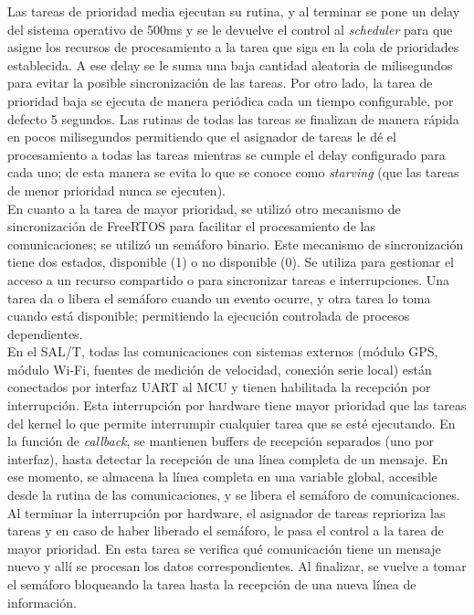 Las tareas de prioridad media ejecutan su rutina, y al terminar se pone un delay del sistema operativo de 500ms y se le devuelve el control al \textit{scheduler} para que asigne los recursos de procesamiento a la tarea que siga en la cola de prioridades establecida. A ese delay se le suma una baja cantidad aleatoria de milisegundos para evitar la posible sincronización de las tareas. Por otro lado, la tarea de prioridad baja se ejecuta de manera periódica cada un tiempo configurable, por defecto 5 segundos. Las rutinas de todas las tareas se finalizan de manera rápida en pocos milisegundos permitiendo que el asignador de tareas le dé el procesamiento a todas las tareas mientras se cumple el delay configurado para cada uno; de esta manera se evita lo que se conoce como \textit{starving} (que las tareas de menor prioridad nunca se ejecuten). \\ 

En cuanto a la tarea de mayor prioridad, se utilizó otro mecanismo de sincronización de FreeRTOS para facilitar el procesamiento de las comunicaciones; se utilizó un semáforo binario. Este mecanismo de sincronización tiene dos estados, disponible (1) o no disponible (0). Se utiliza para gestionar el acceso a un recurso compartido o para sincronizar tareas e interrupciones. Una tarea da o libera el semáforo cuando un evento ocurre, y otra tarea lo toma cuando está disponible; permitiendo la ejecución controlada de procesos dependientes. \\

En el SAL/T, todas las comunicaciones con sistemas externos (módulo GPS, módulo Wi-Fi, fuentes de medición de velocidad, conexión serie local) están conectados por interfaz UART al MCU y tienen habilitada la recepción por interrupción. Esta interrupción por hardware tiene mayor prioridad que las tareas del kernel lo que permite interrumpir cualquier tarea que se esté ejecutando. En la función de \textit{callback}, se mantienen buffers de recepción separados (uno por interfaz), hasta detectar la recepción de una línea completa de un mensaje. En ese momento, se almacena la línea completa en una variable global, accesible desde la rutina de las comunicaciones, y se libera el semáforo de comunicaciones. \\

Al terminar la interrupción por hardware, el asignador de tareas reprioriza las tareas y en caso de haber liberado el semáforo, le pasa el control a la tarea de mayor prioridad. En esta tarea se verifica qué comunicación tiene un mensaje nuevo y allí se procesan los datos correspondientes. Al finalizar, se vuelve a tomar el semáforo bloqueando la tarea hasta la recepción de una nueva línea de información. 

 